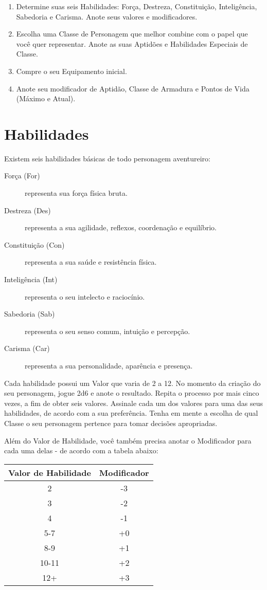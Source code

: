 \documentclass[a5paper, 10pt]{book}
\begin{document}
\begin{enumerate}
	\item Determine suas seis Habilidades: Força, Destreza, Constituição, Inteligência, Sabedoria e Carisma. Anote seus valores e modificadores.
	\item Escolha uma Classe de Personagem que melhor combine com o papel que você quer representar. Anote as suas Aptidões e Habilidades Especiais de Classe.
	\item Compre o seu Equipamento inicial.
	\item Anote seu modificador de Aptidão, Classe de Armadura e Pontos de Vida (Máximo e Atual).
\end{enumerate}

\section{Habilidades}

Existem seis habilidades básicas de todo personagem aventureiro:

\begin{description}
	\item [Força (For)] representa sua força física bruta.
	\item [Destreza (Des)] representa a sua agilidade, reflexos, coordenação e equilíbrio.
	\item [Constituição (Con)] representa a sua saúde e resistência física.
	\item [Inteligência (Int)] representa o seu intelecto e raciocínio.
	\item [Sabedoria (Sab)] representa o seu senso comum, intuição e percepção.
	\item [Carisma (Car)] representa a sua personalidade, aparência e presença.
\end{description}

Cada habilidade possui um Valor que varia de 2 a 12. No momento da criação do seu personagem, jogue 2d6 e anote o resultado. Repita o processo por mais cinco vezes, a fim de obter seis valores. Assinale cada um dos valores para uma das seus habilidades, de acordo com a sua preferência. Tenha em mente a escolha de qual Classe o seu personagem pertence para tomar decisões apropriadas.

Além do Valor de Habilidade, você também precisa anotar o Modificador para cada uma delas - de acordo com a tabela abaixo:

\begin{tabular}{||c c||} 
 \hline
 Valor de Habilidade & Modificador \\ [0.5ex] 
 \hline
	2 & -3 \\
 \hline
	3 & -2 \\ 
 \hline
	4 & -1 \\
 \hline
	5-7 & +0 \\
 \hline
	8-9 & +1 \\
 \hline
	10-11 & +2 \\ 
 \hline
	12+ & +3 \\
 \hline 
\end{tabular}
\end{document}
